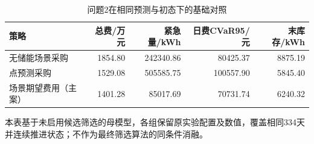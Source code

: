 \begin{table}[htbp]\centering\small
\caption{问题2在相同预测与初态下的基础对照}
\label{tab:v2_baselines}
\begin{tabularx}{\linewidth}{LRRRR}\toprule
策略 & 总费/万元 & 紧急量/kWh & 日费CVaR95/元 & 末库存/kWh\\\midrule
无储能场景采购 & 1854.80 & 242340.86 & 80425.37 & 8875.19\\
点预测采购 & 1529.08 & 505585.75 & 100557.90 & 5845.40\\
场景期望费用（主案） & 1401.28 & 85017.69 & 70731.74 & 6240.32\\
\bottomrule\end{tabularx}
\par\smallskip\parbox{\linewidth}{\footnotesize 本表基于未启用候选筛选的母模型，各组保留原实验配置及数值，覆盖相同334天并连续推进状态；不作为最终筛选算法的同条件消融。}
\end{table}
